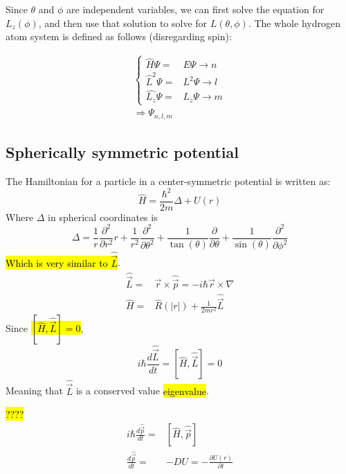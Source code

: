 			Since $\theta$ and $\phi$ are independent variables, we can first solve the equation for $L_z(\phi)$, and then use that solution to solve for $L(\theta, \phi)$. The whole hydrogen atom system is defined as follows (disregarding spin):
			
			\begin{align}
				\left\{ \begin{aligned}
					\hat{H} \Psi =& E \Psi \rightarrow n\\
					\hat{L}^2 \Psi =& L^2 \Psi \rightarrow l \\
					\hat{L_z} \Psi =& L_z \Psi  \rightarrow m
				\end{aligned} \right. \\
				\Rightarrow \Psi_{n,l,m}
			\end{align}
		\subsection{Spherically symmetric potential}
			The Hamiltonian for a particle in a center-symmetric potential is written as:
			\begin{equation}
				\hat{H} = \frac{\hbar^2}{2m}\Delta + U(r)
			\end{equation}
			Where $\Delta$ in spherical coordinates is
			\begin{equation}
				\Delta = \frac{1}{r}\frac{\partial^2}{\partial r ^2}r + \frac{1}{r^2} \frac{\partial^2}{\partial \theta^2} + \frac{1}{\tan(\theta)}\frac{\partial}{\partial \theta} + \frac{1}{\sin(\theta)}\frac{\partial^2}{\partial \phi^2}
			\end{equation}
			\hl{Which is very similar to $\hat{\vec{L}}$}.
			\begin{align}
				\hat{\vec{L}} =& \vec{r}\times\hat{\vec{p}} = -i\hbar\vec{r}\times\nabla \\
				\hat{H} =& \hat{R}(|r|) + \frac{1}{2m r^2}\hat{\vec{L}}
			\end{align}
			Since \hl{$\left[\hat{H}, \hat{\vec{L}}\right] = 0$},
			\begin{equation}
				i\hbar\frac{d\hat{\vec{L}}}{dt} = \left[\hat{H}, \hat{\vec{L}}\right] = 0
			\end{equation}
			Meaning that $\hat{\vec{L}}$ is a conserved value \hl{eigenvalue}.
			
			\hl{????}
			\begin{align}
				i\hbar\frac{d\hat{\vec{p}}}{dt} =& \left[\hat{H}, \hat{\vec{p}}\right] \\
				\frac{d\hat{\vec{p}}}{dt} =& -DU = -\frac{\partial U(r)}{\partial t}
			\end{align}
			
